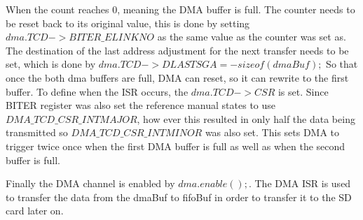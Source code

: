 When the count reaches 0, meaning the DMA buffer is full.
The counter needs to be reset back to its original value, this is done by setting $dma.TCD->BITER\_ELINKNO$ as the same value as the counter was set as.
The destination of the last address adjustment for the next transfer needs to be set, which is done by $dma.TCD->DLASTSGA = -sizeof(dmaBuf);$
So that once the both dma buffers are full, DMA can reset, so it can rewrite to the first buffer.
To define when the ISR occurs, the $dma.TCD->CSR $ is set.
Since BITER register was also set the reference manual states to use $DMA\_TCD\_CSR\_INTMAJOR$, how ever this resulted in only half the data being transmitted so $DMA\_TCD\_CSR\_INTMINOR$ was also set.
This sets DMA to trigger twice once when the first DMA buffer is full as well as when the second buffer is full.

Finally the DMA channel is enabled by $dma.enable();$.
The DMA ISR is used to transfer the data from the dmaBuf to fifoBuf in order to transfer it to the SD card later on. 